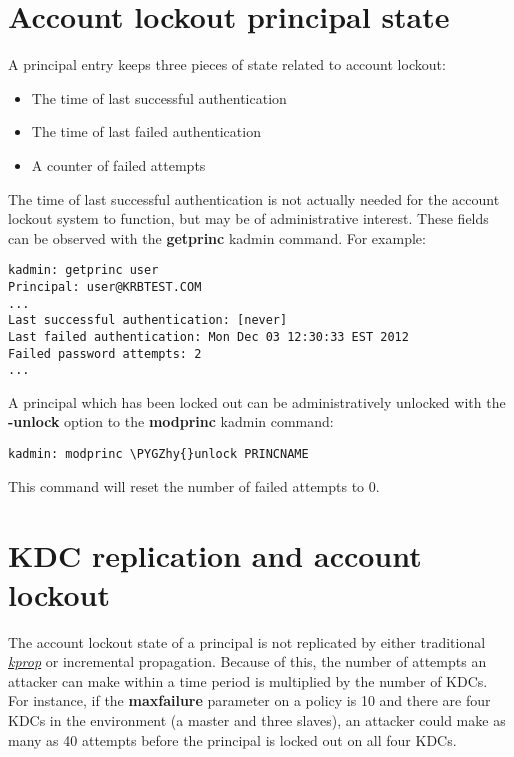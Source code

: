 \documentclass[letterpaper,10pt,english]{sphinxmanual}
\def\PYGZhy{\char`\-}
\begin{document}
\section{Account lockout principal state}
\label{admin/lockout:account-lockout-principal-state}
A principal entry keeps three pieces of state related to account
lockout:
\begin{itemize}
\item {} 
The time of last successful authentication

\item {} 
The time of last failed authentication

\item {} 
A counter of failed attempts

\end{itemize}

The time of last successful authentication is not actually needed for
the account lockout system to function, but may be of administrative
interest.  These fields can be observed with the \textbf{getprinc} kadmin
command.  For example:

\begin{Verbatim}[commandchars=\\\{\}]
kadmin: getprinc user
Principal: user@KRBTEST.COM
...
Last successful authentication: [never]
Last failed authentication: Mon Dec 03 12:30:33 EST 2012
Failed password attempts: 2
...
\end{Verbatim}

A principal which has been locked out can be administratively unlocked
with the \textbf{-unlock} option to the \textbf{modprinc} kadmin command:

\begin{Verbatim}[commandchars=\\\{\}]
kadmin: modprinc \PYGZhy{}unlock PRINCNAME
\end{Verbatim}

This command will reset the number of failed attempts to 0.


\section{KDC replication and account lockout}
\label{admin/lockout:kdc-replication-and-account-lockout}
The account lockout state of a principal is not replicated by either
traditional {\hyperref[admin/admin_commands/kprop:kprop-8]{\emph{kprop}}} or incremental propagation.  Because of
this, the number of attempts an attacker can make within a time period
is multiplied by the number of KDCs.  For instance, if the
\textbf{maxfailure} parameter on a policy is 10 and there are four KDCs in
the environment (a master and three slaves), an attacker could make as
many as 40 attempts before the principal is locked out on all four
KDCs.
\end{document}
